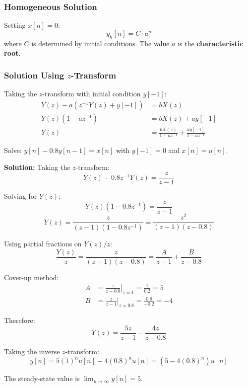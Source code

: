 \subsubsection{Homogeneous Solution}
Setting $x[n] = 0$:
\begin{equation}
y_h[n] = C \cdot a^n
\end{equation}
where $C$ is determined by initial conditions. The value $a$ is the \textbf{characteristic root}.

\subsubsection{Solution Using $z$-Transform}
Taking the $z$-transform with initial condition $y[-1]$:
\begin{align}
Y(z) - a\left(z^{-1}Y(z) + y[-1]\right) &= bX(z) \\
Y(z)\left(1 - az^{-1}\right) &= bX(z) + ay[-1] \\
Y(z) &= \frac{bX(z)}{1 - az^{-1}} + \frac{ay[-1]}{1 - az^{-1}}
\end{align}

\begin{examplebox}[title=Example: First-Order Difference Equation]
Solve: $y[n] - 0.8y[n-1] = x[n]$ with $y[-1] = 0$ and $x[n] = u[n]$.

\textbf{Solution:}
Taking the $z$-transform:
\begin{equation}
Y(z) - 0.8z^{-1}Y(z) = \frac{z}{z-1}
\end{equation}

Solving for $Y(z)$:
\begin{equation}
Y(z)\left(1 - 0.8z^{-1}\right) = \frac{z}{z-1}
\end{equation}
\begin{equation}
Y(z) = \frac{z}{(z-1)(1 - 0.8z^{-1})} = \frac{z^2}{(z-1)(z-0.8)}
\end{equation}

Using partial fractions on $Y(z)/z$:
\begin{equation}
\frac{Y(z)}{z} = \frac{z}{(z-1)(z-0.8)} = \frac{A}{z-1} + \frac{B}{z-0.8}
\end{equation}

Cover-up method:
\begin{align}
A &= \left.\frac{z}{z-0.8}\right|_{z=1} = \frac{1}{0.2} = 5 \\
B &= \left.\frac{z}{z-1}\right|_{z=0.8} = \frac{0.8}{-0.2} = -4
\end{align}

Therefore:
\begin{equation}
Y(z) = \frac{5z}{z-1} - \frac{4z}{z-0.8}
\end{equation}

Taking the inverse $z$-transform:
\begin{equation}
\boxed{y[n] = 5(1)^n u[n] - 4(0.8)^n u[n] = \left(5 - 4(0.8)^n\right)u[n]}
\end{equation}

The steady-state value is $\lim_{n\to\infty} y[n] = 5$.
\end{examplebox}

